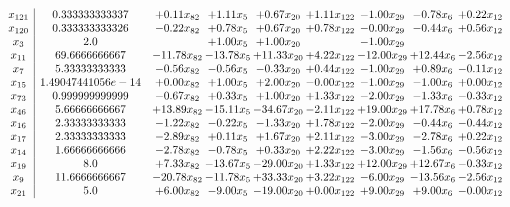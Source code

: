 \documentclass[8pt]{article}
\begin{document}
\[\begin{array}{c| c c@{\hskip 2pt} c@{\hskip 2pt} c@{\hskip 2pt} c@{\hskip 2pt} c@{\hskip 2pt} c@{\hskip 2pt} c@{\hskip 2pt} }
 x_{121}   &  0.333333333337 & +  0.11 x_{82} & +  1.11 x_{5} & +  0.67 x_{20} & +  1.11 x_{122} & -1.00 x_{29} & -0.78 x_{6} & +  0.22 x_{12}\\
 x_{120}   &  0.333333333326 & -0.22 x_{82} & +  0.78 x_{5} & +  0.67 x_{20} & +  0.78 x_{122} & -0.00 x_{29} & -0.44 x_{6} & +  0.56 x_{12}\\
 x_{3}   &  2.0  &   & +  1.00 x_{5} & +  1.00 x_{20} &   & -1.00 x_{29} &    &   \\
 x_{11}   &  69.6666666667 & -11.78 x_{82} & -13.78 x_{5} & + 11.33 x_{20} & +  4.22 x_{122} & -12.00 x_{29} & + 12.44 x_{6} & -2.56 x_{12}\\
 x_{7}   &  5.33333333333 & -0.56 x_{82} & -0.56 x_{5} & -0.33 x_{20} & +  0.44 x_{122} & -1.00 x_{29} & +  0.89 x_{6} & -0.11 x_{12}\\
 x_{15}   &  1.49047441056e-14 & +  0.00 x_{82} & +  1.00 x_{5} & +  2.00 x_{20} & -0.00 x_{122} & -1.00 x_{29} & -1.00 x_{6} & +  0.00 x_{12}\\
 x_{73}   &  0.999999999999 & -0.67 x_{82} & +  0.33 x_{5} & +  1.00 x_{20} & +  1.33 x_{122} & -2.00 x_{29} & -1.33 x_{6} & -0.33 x_{12}\\
 x_{46}   &  5.66666666667 & + 13.89 x_{82} & -15.11 x_{5} & -34.67 x_{20} & -2.11 x_{122} & + 19.00 x_{29} & + 17.78 x_{6} & +  0.78 x_{12}\\
 x_{16}   &  2.33333333333 & -1.22 x_{82} & -0.22 x_{5} & -1.33 x_{20} & +  1.78 x_{122} & -2.00 x_{29} & -0.44 x_{6} & -0.44 x_{12}\\
 x_{17}   &  2.33333333333 & -2.89 x_{82} & +  0.11 x_{5} & +  1.67 x_{20} & +  2.11 x_{122} & -3.00 x_{29} & -2.78 x_{6} & +  0.22 x_{12}\\
 x_{14}   &  1.66666666666 & -2.78 x_{82} & -0.78 x_{5} & +  0.33 x_{20} & +  2.22 x_{122} & -3.00 x_{29} & -1.56 x_{6} & -0.56 x_{12}\\
 x_{19}   &  8.0 & +  7.33 x_{82} & -13.67 x_{5} & -29.00 x_{20} & +  1.33 x_{122} & + 12.00 x_{29} & + 12.67 x_{6} & -0.33 x_{12}\\
 x_{9}   &  11.6666666667 & -20.78 x_{82} & -11.78 x_{5} & + 33.33 x_{20} & +  3.22 x_{122} & -6.00 x_{29} & -13.56 x_{6} & -2.56 x_{12}\\
 x_{21}   &  5.0 & +  6.00 x_{82} & -9.00 x_{5} & -19.00 x_{20} & +  0.00 x_{122} & +  9.00 x_{29} & +  9.00 x_{6} & -0.00 x_{12}\\

\end{array}\]
\end{document}
